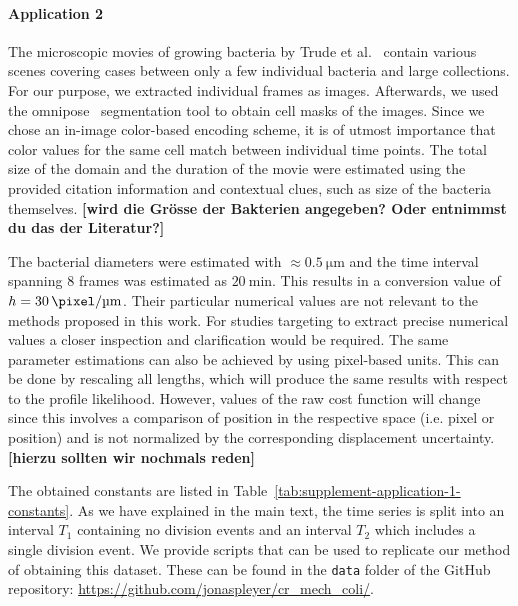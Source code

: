 \documentclass[10pt,letterpaper]{article}
\begin{document}
\paragraph*{Application 2}
\label{sec:supplement-data-details}
The microscopic movies of growing bacteria by Trude et al.~\cite{Trude1982} contain various scenes
covering cases between only a few individual bacteria and large collections.
For our purpose, we extracted individual frames as images.
Afterwards, we used the omnipose~\cite{Cutler2022} segmentation tool to obtain cell masks of the
images. Since we chose an in-image color-based encoding scheme, it is of utmost importance that
color values for the same cell match between individual time points.
The total size of the domain and the duration of the movie were estimated using the provided citation
information and contextual clues, such as size of the bacteria themselves.
{\bf [wird die Grösse der Bakterien angegeben? Oder entnimmst du das der Literatur?]}

The bacterial diameters were estimated with $\approx\SI{0.5}{\micro\metre}$ and the time
interval spanning $8$ frames was estimated as $\SI{20}{\minute}$.
This results in a conversion value of $h=\SI{30}{\pixel\per\micro\metre}$.
Their particular numerical values are not relevant to the methods proposed in this work.
For studies targeting to extract precise numerical
values a closer inspection and clarification would be required.
The same parameter estimations can also be achieved by using pixel-based units.
This can be done by rescaling all lengths, which will produce the same results with respect to the
profile likelihood.
However, values of the raw cost function will change since this involves a comparison of position
in the respective space (i.e. pixel or position) and is not normalized by the corresponding
displacement uncertainty.
{\bf [hierzu sollten wir nochmals reden]}

The obtained constants are listed in Table~\ref{tab:supplement-application-1-constants}.
As we have explained in the main text, the time series is split into an interval $T_1$ containing no
division events and an interval $T_2$ which includes a single division event.
We provide scripts that can be used to replicate our method of obtaining this dataset.
These can be found in the \texttt{data} folder of the GitHub repository:
\url{https://github.com/jonaspleyer/cr_mech_coli/}.
\end{document}

